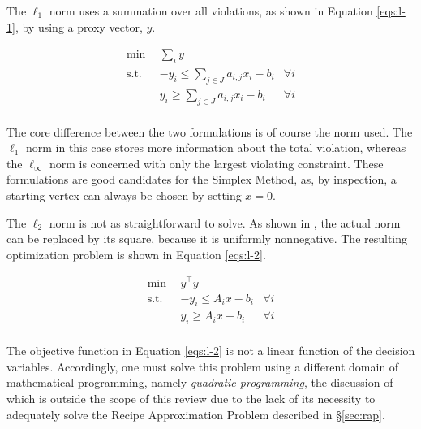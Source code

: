 The $\ell_1$ norm uses a summation over all violations, as shown in
Equation \ref{eqs:l-1}, by using a proxy vector, $y$.

\begin{subequations}\label{eqs:l-1}
  \begin{align}
    \min \:\: & 
    \sum_i y
    & \\
    \text{s.t.} \:\: &
    - y_i \leq \sum_{j \in J} a_{i,j} x_i - b_i
    & \forall i \\
    &
    y_i \geq \sum_{j \in J} a_{i,j} x_i - b_i
    & \forall i \\
  \end{align}
\end{subequations}

The core difference between the two formulations is of course the norm used. The
$\ell_1$ norm in this case stores more information about the total violation,
whereas the $\ell_\infty$ norm is concerned with only the largest violating
constraint. These formulations are good candidates for the Simplex Method, as,
by inspection, a starting vertex can always be chosen by setting $x = 0$.

The $\ell_2$ norm is not as straightforward to solve. As shown
in \cite{ferris_linear_2008}, the actual norm can be replaced by its square,
because it is uniformly nonnegative. The resulting optimization problem is shown
in Equation \ref{eqs:l-2}.

\begin{subequations}\label{eqs:l-2}
  \begin{align}
    \min \:\: & 
    y^\top y
    & \\
    \text{s.t.} \:\: &
    - y_i \leq A_i x - b_i
    & \forall i \\
    &
    y_i \geq A_i x - b_i
    & \forall i \\
  \end{align}
\end{subequations}

The objective function in Equation \ref{eqs:l-2} is not a linear function of the
decision variables. Accordingly, one must solve this problem using a different
domain of mathematical programming, namely \textit{quadratic programming}, the
discussion of which is outside the scope of this review due to the lack of its
necessity to adequately solve the Recipe Approximation Problem described
in \S\ref{sec:rap}.
